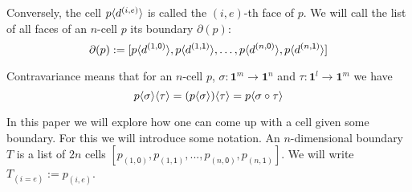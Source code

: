 \documentclass[11pt]{article}
\theoremstyle{definition}
\newcommand{\mdef}{:=}
\newcommand{\mlist}[1]{[ {#1} ]}
\newcommand{\pint}[1]{\mathbf{1}^{#1}}
\newcommand{\pintrestr}[3]{\mathbf{1}^{#1}_{{#2}={#3}}}
\newcommand{\izero}{\mathsf{0}}
\newcommand{\ione}{\mathsf{1}}
\newcommand{\restrict}[2]{{#1}|_{#2}}
\newcommand{\smap}[1]{s^{{#1}}}
\newcommand{\dmap}[2]{d^{({#1} , {#2})}}
\newcommand{\cont}[2]{\ensuremath{ \ifthenelse{\equal{#2}{}}{#1}{{#1}\langle{#2}\rangle}} }
\newcommand{\boundary}[1]{\partial({#1})}
\newcommand{\comp}[2]{\mathsf{Comp}({#1}\ {#2})}
\begin{document}
Conversely, the cell $\cont{p}{\dmap{i}{e}}$ is called the $(i,e)$-th face of $p$. We
will call the list of all faces of an $n$-cell $p$ its boundary $\boundary{p}$:
$$\boundary{p} \mdef \mlist{ \cont{p}{\dmap{1}{\izero}},
  \cont{p}{\dmap{1}{\ione}} , \ldots , \cont{p}{\dmap{n}{\izero}}, \cont{p}{\dmap{n}{\ione}} }$$




Contravariance means that for an $n$-cell $p$, $\sigma : \pint{m} \to \pint{n}$ and $\tau : \pint{l} \to \pint{m}$ we have
$$\cont{\cont{p}{\sigma}}{\tau} = \cont{(\cont{p}{\sigma})}{\tau} = \cont{p}{\sigma \circ \tau}$$



In this paper we will explore how one can come up with a cell given some
boundary. For this we will introduce some notation. An
$n$-dimensional boundary $T$ is a list of $2n$ cells $\mlist{p_{(1,\izero)},
  p_{(1,\ione)} , ... , p_{(n,\izero)}, p_{(n, \ione)}}$. We will write
$T_{(i=e)} \mdef p_{(i,e)}$. %






\end{document}
